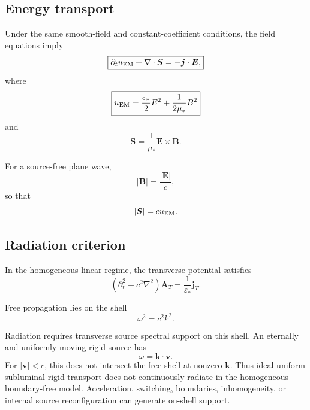 \documentclass[11pt]{article}
\begin{document}
\subsection{Energy transport}

Under the same smooth-field and constant-coefficient conditions, the field equations imply
\begin{equation}
\boxed{
\partial_tu_{\rm EM}
+
\nabla\cdot\bm S
=
-\bm j\cdot\bm E,
}
\end{equation}
where
\begin{equation}
\boxed{
u_{\rm EM}
=
\frac{\varepsilon_*}{2}E^2
+
\frac{1}{2\mu_*}B^2
}
\end{equation}
and
\begin{equation}
\boxed{
\bm S
=
\frac{1}{\mu_*}
\bm E\times\bm B.
}
\end{equation}

For a source-free plane wave,
\begin{equation}
|\bm B|
=
\frac{|\bm E|}{c},
\end{equation}
so that
\begin{equation}
|\bm S|=cu_{\rm EM}.
\end{equation}

\subsection{Radiation criterion}

In the homogeneous linear regime, the transverse potential satisfies
\begin{equation}
\left(
\partial_t^2-c^2\nabla^2
\right)
\bm A_T
=
\frac{1}{\varepsilon_*}\bm j_T.
\end{equation}

Free propagation lies on the shell
\begin{equation}
\boxed{
\omega^2=c^2k^2.
}
\end{equation}

Radiation requires transverse source spectral support on this shell. An eternally and uniformly moving rigid source has
\begin{equation}
\omega=\bm k\cdot\bm v.
\end{equation}
For $|\bm v|<c$, this does not intersect the free shell at nonzero $\bm k$. Thus ideal uniform subluminal rigid transport does not continuously radiate in the homogeneous boundary-free model. Acceleration, switching, boundaries, inhomogeneity, or internal source reconfiguration can generate on-shell support.
\end{document}
